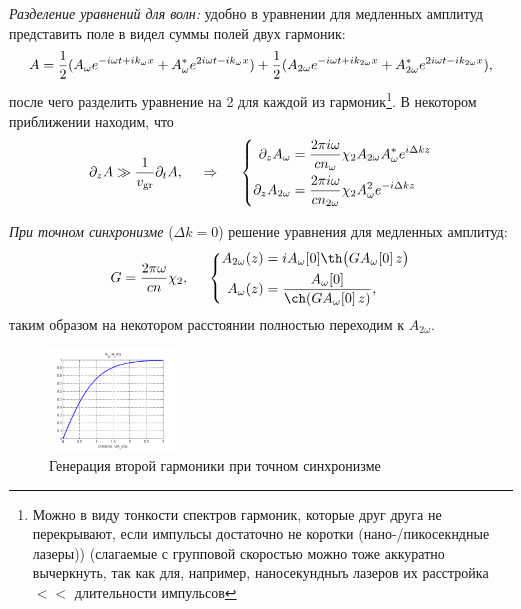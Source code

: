 \textit{Разделение уравнений для волн:} удобно в уравнении для медленных амплитуд представить поле в видел суммы полей двух гармоник:
\begin{equation*}
    A = \frac{1}{2} (A_{\omega}e^{-i\omega t +i k_{\omega}x} + A^*_{\omega}e^{2i\omega t -i k_{\omega}x}) + \\ \frac{1}{2} (A_{2\omega}e^{-i\omega t +i k_{2\omega}x} + A^*_{2\omega}e^{2i\omega t -i k_{2\omega}x}),
\end{equation*}
после чего разделить уравнение на 2 для каждой из гармоник\footnote{
    Можно в виду тонкости спектров гармоник, которые друг друга не перекрывают, если импульсы достаточно не коротки (нано-/пикосекндные лазеры)) (слагаемые с групповой скоростью можно тоже аккуратно вычеркнуть, так как для, например, наносекундныъ лазеров их расстройка $<<$ длительности импульсов
}. В некотором приближении находим, что
\begin{equation*}
    \partial_z A \gg \frac{1}{v_{\textnormal{gr}}} \partial_t A,
    \hspace{0.5cm} \Rightarrow \hspace{0.5cm}
\left\{\begin{aligned}
        \partial_z A_{\omega}&=\frac{2\pi i \omega}{cn_{\omega}} \chi_{2} A_{2\omega}A^*_{\omega} e^{i \Delta k z} \\
    \partial_z A_{2\omega} &=\frac{2\pi i \omega}{cn_{2\omega}} \chi_{2} A_{\omega}^{2} e^{- i \Delta k z} 
    \end{aligned}\right.
\end{equation*}



\textit{При точном синхронизме} ($\Delta k = 0$) решение уравнения для медленных амплитуд: 
\begin{equation*}
G=\frac{2\pi \omega}{cn}\chi_{2}, \hspace{5 mm} 
    \left\{\begin{aligned}
        A_{2\omega}(z) &=iA_{\omega}[0] \th\big(G A_{\omega}[0]\,  z\big) \\
        A_{\omega}(z) &=\frac{A_\omega[0]}{\ch(G A_{\omega}[0]\, z)},
    \end{aligned}\right.
\end{equation*}
таким образом на некотором расстоянии полностью переходим к $A_{2 \omega}$.
\begin{figure}[h]
    \centering
    \includegraphics[width=0.3\textwidth]{figures/4_1.png}
    \caption{Генерация второй гармоники при точном синхронизме}
\end{figure}
